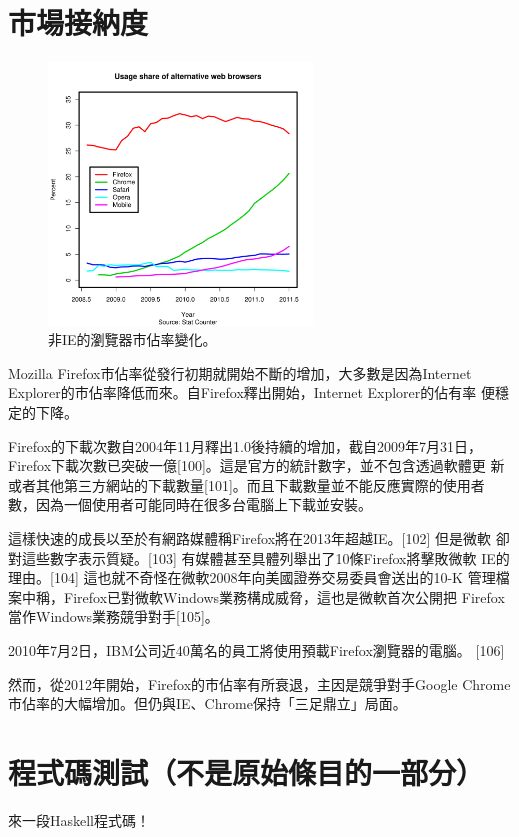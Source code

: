 \documentclass[12pt, a4paper, twoside]{article}
\begin{document}
\section{市場接納度}

\begin{figure}
  \begin{center}
    \includegraphics[width=70mm]{Usage}
  \end{center}
  \caption{非IE的瀏覽器市佔率變化。}
\end{figure}

Mozilla Firefox市佔率從發行初期就開始不斷的增加，大多數是因為Internet
Explorer的市佔率降低而來。自Firefox釋出開始，Internet Explorer的佔有率
便穩定的下降。

Firefox的下載次數自2004年11月釋出1.0後持續的增加，截自2009年7月31日，
Firefox下載次數已突破一億[100]。這是官方的統計數字，並不包含透過軟體更
新或者其他第三方網站的下載數量[101]。而且下載數量並不能反應實際的使用者
數，因為一個使用者可能同時在很多台電腦上下載並安裝。

這樣快速的成長以至於有網路媒體稱Firefox將在2013年超越IE。[102] 但是微軟
卻對這些數字表示質疑。[103] 有媒體甚至具體列舉出了10條Firefox將擊敗微軟
IE的理由。[104] 這也就不奇怪在微軟2008年向美國證券交易委員會送出的10-K
管理檔案中稱，Firefox已對微軟Windows業務構成威脅，這也是微軟首次公開把
Firefox當作Windows業務競爭對手[105]。

2010年7月2日，IBM公司近40萬名的員工將使用預載Firefox瀏覽器的電腦。
[106]

然而，從2012年開始，Firefox的市佔率有所衰退，主因是競爭對手Google
Chrome市佔率的大幅增加。但仍與IE、Chrome保持「三足鼎立」局面。

\section{程式碼測試（不是原始條目的一部分）}
來一段Haskell程式碼！
\end{document}
